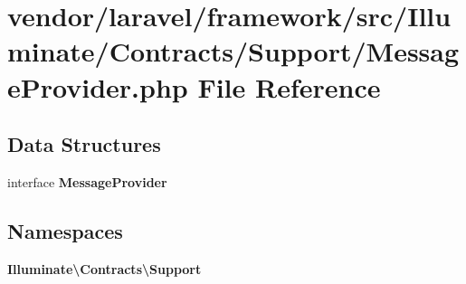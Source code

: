 \section{vendor/laravel/framework/src/\+Illuminate/\+Contracts/\+Support/\+Message\+Provider.php File Reference}
\label{_message_provider_8php}
\subsection*{Data Structures}
\begin{DoxyCompactItemize}
\item 
interface {\bf Message\+Provider}
\end{DoxyCompactItemize}
\subsection*{Namespaces}
\begin{DoxyCompactItemize}
\item 
 {\bf Illuminate\textbackslash{}\+Contracts\textbackslash{}\+Support}
\end{DoxyCompactItemize}
